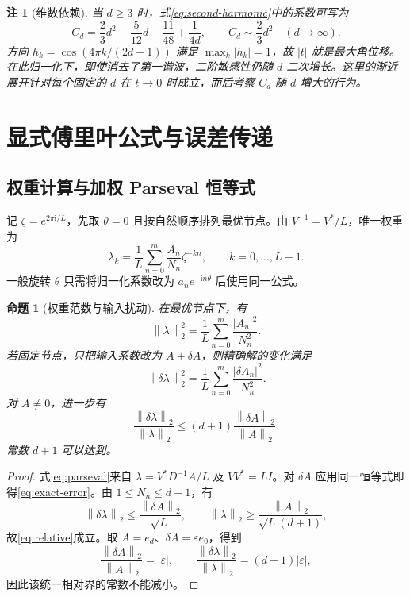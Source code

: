 \documentclass[UTF8,a4paper,zihao=-4,fontset=windows]{ctexart}
\theoremstyle{chinese}
\newtheorem{proposition}[theorem]{命题}
\newtheorem{remark}[theorem]{注}
\numberwithin{equation}{section}
\newcommand{\norm}[1]{\left\lVert#1\right\rVert_2}
\begin{document}
\begin{remark}[维数依赖]\label{rem:dimension}
当 $d\ge3$ 时，式\eqref{eq:second-harmonic}中的系数可写为
\begin{equation}\label{eq:dimension-coefficient}
C_d=\frac23d^2-\frac5{12}d+\frac{11}{48}+\frac1{4d},
\qquad C_d\sim\frac23d^2\quad(d\to\infty).
\end{equation}
方向 $h_k=\cos(4\pi k/(2d+1))$ 满足 $\max_k|h_k|=1$，故 $|t|$ 就是最大角位移。在此归一化下，即使消去了第一谐波，二阶敏感性仍随 $d$ 二次增长。这里的渐近展开针对每个固定的 $d$ 在 $t\to0$ 时成立，而后考察 $C_d$ 随 $d$ 增大的行为。
\end{remark}

\section{显式傅里叶公式与误差传递}
\subsection{权重计算与加权 Parseval 恒等式}
记 $\zeta=e^{2\pi\mathrm i/L}$，先取 $\theta=0$ 且按自然顺序排列最优节点。由 $V^{-1}=V^*/L$，唯一权重为
\begin{equation}\label{eq:FFT}
\lambda_k=\frac1L\sum_{n=0}^{m}\frac{A_n}{N_n}\zeta^{-kn},
\qquad k=0,\ldots,L-1.
\end{equation}
一般旋转 $\theta$ 只需将归一化系数改为 $a_ne^{-\mathrm in\theta}$ 后使用同一公式。

\begin{proposition}[权重范数与输入扰动]\label{prop:perturb}
在最优节点下，有
\begin{equation}\label{eq:parseval}
\norm{\lambda}^2=\frac1L\sum_{n=0}^{m}\frac{|A_n|^2}{N_n^2}.
\end{equation}
若固定节点，只把输入系数改为 $A+\delta A$，则精确解的变化满足
\begin{equation}\label{eq:exact-error}
\norm{\delta\lambda}^2=\frac1L\sum_{n=0}^{m}\frac{|\delta A_n|^2}{N_n^2}.
\end{equation}
对 $A\ne0$，进一步有
\begin{equation}\label{eq:relative}
\frac{\norm{\delta\lambda}}{\norm{\lambda}}
\le(d+1)\frac{\norm{\delta A}}{\norm{A}}.
\end{equation}
常数 $d+1$ 可以达到。
\end{proposition}
\begin{proof}
式\eqref{eq:parseval}来自 $\lambda=V^*D^{-1}A/L$ 及 $VV^*=LI$。对 $\delta A$ 应用同一恒等式即得\eqref{eq:exact-error}。由 $1\le N_n\le d+1$，有
\[
\norm{\delta\lambda}\le\frac{\norm{\delta A}}{\sqrt L},
\qquad \norm{\lambda}\ge\frac{\norm A}{\sqrt L(d+1)},
\]
故\eqref{eq:relative}成立。取 $A=e_d$、$\delta A=\varepsilon e_0$，得到
\[
\frac{\norm{\delta A}}{\norm A}=|\varepsilon|,
\qquad
\frac{\norm{\delta\lambda}}{\norm\lambda}=(d+1)|\varepsilon|,
\]
因此该统一相对界的常数不能减小。
\end{proof}
\end{document}
